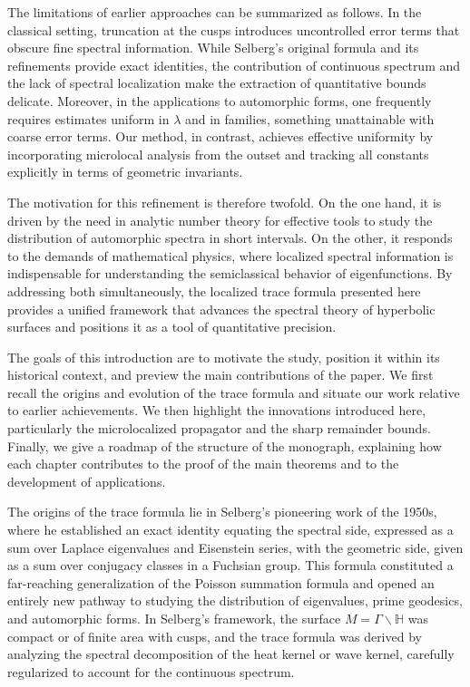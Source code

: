 The limitations of earlier approaches can be summarized as follows. In the
classical setting, truncation at the cusps introduces uncontrolled error terms
that obscure fine spectral information. While Selberg’s original formula and
its refinements provide exact identities, the contribution of continuous
spectrum and the lack of spectral localization make the extraction of
quantitative bounds delicate. Moreover, in the applications to automorphic
forms, one frequently requires estimates uniform in $\lambda$ and in families,
something unattainable with coarse error terms. Our method, in contrast,
achieves effective uniformity by incorporating microlocal analysis from the
outset and tracking all constants explicitly in terms of geometric invariants.

The motivation for this refinement is therefore twofold. On the one hand, it
is driven by the need in analytic number theory for effective tools to study
the distribution of automorphic spectra in short intervals. On the other, it
responds to the demands of mathematical physics, where localized spectral
information is indispensable for understanding the semiclassical behavior of
eigenfunctions. By addressing both simultaneously, the localized trace formula
presented here provides a unified framework that advances the spectral theory
of hyperbolic surfaces and positions it as a tool of quantitative precision.

The goals of this introduction are to motivate the study, position it within
its historical context, and preview the main contributions of the paper. We
first recall the origins and evolution of the trace formula and situate our
work relative to earlier achievements. We then highlight the innovations
introduced here, particularly the microlocalized propagator and the sharp
remainder bounds. Finally, we give a roadmap of the structure of the
monograph, explaining how each chapter contributes to the proof of the main
theorems and to the development of applications.

The origins of the trace formula lie in Selberg’s pioneering work of the 1950s,
where he established an exact identity equating the spectral side, expressed as
a sum over Laplace eigenvalues and Eisenstein series, with the geometric side,
given as a sum over conjugacy classes in a Fuchsian group. This formula
constituted a far-reaching generalization of the Poisson summation formula and
opened an entirely new pathway to studying the distribution of eigenvalues,
prime geodesics, and automorphic forms. In Selberg’s framework, the surface
$M=\Gamma\backslash\mathbb{H}$ was compact or of finite area with cusps, and
the trace formula was derived by analyzing the spectral decomposition of the
heat kernel or wave kernel, carefully regularized to account for the continuous
spectrum.

